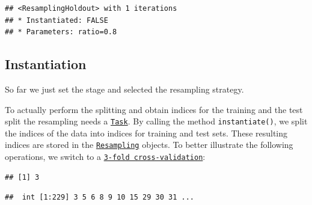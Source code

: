 \documentclass[
]{scrbook}
\newenvironment{Shaded}{\begin{snugshade}}{\end{snugshade}}
\newcommand{\AttributeTok}[1]{\textcolor[rgb]{0.77,0.63,0.00}{#1}}
\newcommand{\DecValTok}[1]{\textcolor[rgb]{0.00,0.00,0.81}{#1}}
\newcommand{\FunctionTok}[1]{\textcolor[rgb]{0.00,0.00,0.00}{#1}}
\newcommand{\NormalTok}[1]{#1}
\newcommand{\OtherTok}[1]{\textcolor[rgb]{0.56,0.35,0.01}{#1}}
\newcommand{\SpecialCharTok}[1]{\textcolor[rgb]{0.00,0.00,0.00}{#1}}
\newcommand{\StringTok}[1]{\textcolor[rgb]{0.31,0.60,0.02}{#1}}
\renewenvironment{Shaded} {\begin{snugshade}\small} {\end{snugshade}}
\begin{document}
\begin{verbatim}
## <ResamplingHoldout> with 1 iterations
## * Instantiated: FALSE
## * Parameters: ratio=0.8
\end{verbatim}

\hypertarget{resampling-inst}{%
\subsection{Instantiation}\label{resampling-inst}}

So far we just set the stage and selected the resampling strategy.

To actually perform the splitting and obtain indices for the training and the test split the resampling needs a \href{https://mlr3.mlr-org.com/reference/Task.html}{\texttt{Task}}.
By calling the method \texttt{instantiate()}, we split the indices of the data into indices for training and test sets.
These resulting indices are stored in the \href{https://mlr3.mlr-org.com/reference/Resampling.html}{\texttt{Resampling}} objects.
To better illustrate the following operations, we switch to a \href{https://mlr3.mlr-org.com/reference/mlr_resamplings_cv.html}{\texttt{3-fold\ cross-validation}}:

\begin{Shaded}
\end{Shaded}

\begin{verbatim}
## [1] 3
\end{verbatim}

\begin{Shaded}
\end{Shaded}

\begin{verbatim}
##  int [1:229] 3 5 6 8 9 10 15 29 30 31 ...
\end{verbatim}

\begin{Shaded}
\end{Shaded}
\end{document}
